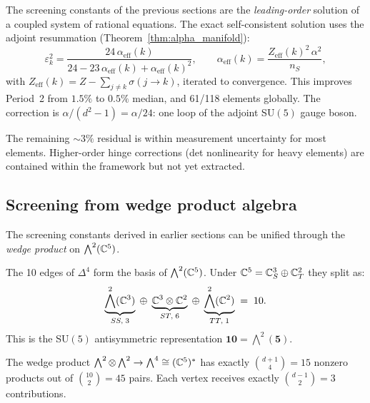\begin{remark}
The screening constants of the previous sections are the \emph{leading-order} solution of a coupled system of rational equations.  The exact self-consistent solution uses the adjoint resummation (Theorem~\ref{thm:alpha_manifold}):
\begin{equation}
\varepsilon_k^2 = \frac{24\,\alpha_{\text{eff}}(k)}{24 - 23\,\alpha_{\text{eff}}(k) + \alpha_{\text{eff}}(k)^2},
\qquad
\alpha_{\text{eff}}(k) = \frac{Z_{\text{eff}}(k)^2\,\alpha^2}{n_S},
\end{equation}
with $Z_\text{eff}(k) = Z - \sum_{j \neq k} \sigma(j \to k)$, iterated to convergence.  This improves Period~2 from $1.5\%$ to $0.5\%$ median, and 61/118 elements globally.  The correction is $\alpha/(d^2\!-\!1) = \alpha/24$: one loop of the adjoint SU$(5)$ gauge boson.

The remaining $\sim 3\%$ residual is within measurement uncertainty for most elements.  Higher-order hinge corrections (det nonlinearity for heavy elements) are contained within the framework but not yet extracted.

\subsection{Screening from wedge product algebra}
\label{sec:wedge_screening}

The screening constants derived in earlier sections can be unified through the \emph{wedge product} on $\bigwedge^2(\mathbb{C}^5)$.

\begin{definition}
The 10 edges of $\Delta^4$ form the basis of $\bigwedge^2(\mathbb{C}^5)$.
Under $\mathbb{C}^5 = \mathbb{C}^3_S \oplus \mathbb{C}^2_T$ they split as:
\[
\underbrace{\bigwedge^2(\mathbb{C}^3)}_{SS,\;3}
\;\oplus\;
\underbrace{\mathbb{C}^3 \otimes \mathbb{C}^2}_{ST,\;6}
\;\oplus\;
\underbrace{\bigwedge^2(\mathbb{C}^2)}_{TT,\;1}
\;=\; 10.
\]
This is the SU$(5)$ antisymmetric representation $\mathbf{10} = \bigwedge^2(\mathbf{5})$.
\end{definition}

\begin{theorem}
\label{thm:wedge_count}
The wedge product $\bigwedge^2 \otimes \bigwedge^2 \to \bigwedge^4 \cong (\mathbb{C}^5)^*$ has exactly $\binom{d+1}{4} = 15$ nonzero products out of $\binom{10}{2} = 45$ pairs.  Each vertex receives exactly $\binom{d-1}{2} = 3$ contributions.
\end{theorem}


\end{remark}
